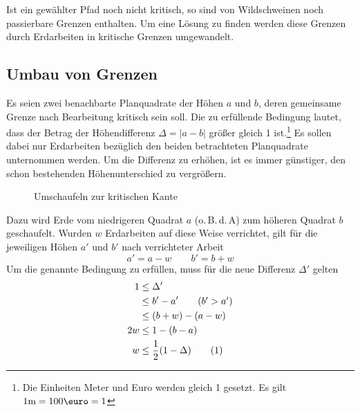 \documentclass[a4paper, 12pt]{scrartcl}
\newcommand{\tagyoureit}{\addtocounter{equation}{1}\tag{\theequation}}
\begin{document}
Ist ein gewählter Pfad noch nicht kritisch, so sind von Wildschweinen noch passierbare Grenzen enthalten. Um eine Lösung zu finden werden diese Grenzen durch Erdarbeiten in kritische Grenzen umgewandelt.
\subsection{Umbau von Grenzen}
Es seien zwei benachbarte Planquadrate der Höhen $a$ und $b$, deren gemeinsame Grenze nach Bearbeitung kritisch sein soll. Die zu erfüllende Bedingung lautet, dass der Betrag der Höhendifferenz $\Delta = |a-b|$ größer gleich 1 ist.\footnote{Die Einheiten Meter und Euro werden gleich 1 gesetzt. Es gilt $1 \mathrm{m} = 100\text{\euro} = 1$} Es sollen dabei nur Erdarbeiten bezüglich den beiden betrachteten Planquadrate unternommen werden. Um die Differenz zu erhöhen, ist es immer günstiger, den schon bestehenden Höhenunterschied zu vergrößern.
\begin{figure}[H]
	\centering
	\caption{Umschaufeln zur kritischen Kante}
\end{figure}
Dazu wird Erde vom niedrigeren Quadrat $a$ (o.\,B.\,d.\,A) zum höheren Quadrat $b$ geschaufelt. Wurden $w$ Erdarbeiten auf diese Weise verrichtet, gilt für die jeweiligen Höhen $a'$ und $b'$ nach verrichteter Arbeit
\begin{equation*}
	a' = a - w \qquad b' = b + w
\end{equation*}
Um die genannte Bedingung zu erfüllen, muss für die neue Differenz $\Delta'$ gelten
\begin{align*}
	 1&\le \Delta'  \\
	 &\le b' - a' \tag{$b' > a'$}\\
	 &\le (b+w) - (a - w)\\
	 2w &\le 1 - (b-a)\\
	 w &\le \frac{1}{2}(1 - \Delta) \tagyoureit\label{eq:arbeit}
\end{align*}
\end{document}
